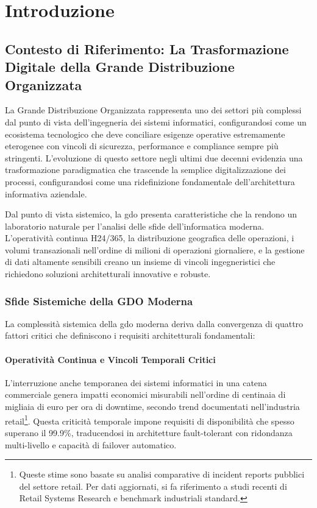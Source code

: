 
\chapter{Introduzione}
\label{ch:introduzione}

\section{Contesto di Riferimento: La Trasformazione Digitale della Grande Distribuzione Organizzata}
\label{sec:contesto-gdo}

La Grande Distribuzione Organizzata rappresenta uno dei settori più complessi dal punto di vista dell'ingegneria dei sistemi informatici, configurandosi come un ecosistema tecnologico che deve conciliare esigenze operative estremamente eterogenee con vincoli di sicurezza, performance e compliance sempre più stringenti. L'evoluzione di questo settore negli ultimi due decenni evidenzia una trasformazione paradigmatica che trascende la semplice digitalizzazione dei processi, configurandosi come una ridefinizione fondamentale dell'architettura informativa aziendale.

Dal punto di vista sistemico, la \gls{gdo} presenta caratteristiche che la rendono un laboratorio naturale per l'analisi delle sfide dell'informatica moderna. L'operatività continua H24/365, la distribuzione geografica delle operazioni, i volumi transazionali nell'ordine di milioni di operazioni giornaliere, e la gestione di dati altamente sensibili creano un insieme di vincoli ingegneristici che richiedono soluzioni architetturali innovative e robuste.

\subsection{Sfide Sistemiche della GDO Moderna}
\label{subsec:sfide-sistemiche}

La complessità sistemica della \gls{gdo} moderna deriva dalla convergenza di quattro fattori critici che definiscono i requisiti architetturali fondamentali:

\subsubsection{Operatività Continua e Vincoli Temporali Critici}

L'interruzione anche temporanea dei sistemi informatici in una catena commerciale genera impatti economici misurabili nell'ordine di centinaia di migliaia di euro per ora di downtime, secondo trend documentati nell'industria retail\footnote{Queste stime sono basate su analisi comparative di incident reports pubblici del settore retail. Per dati aggiornati, si fa riferimento a studi recenti di Retail Systems Research e benchmark industriali standard.}. Questa criticità temporale impone requisiti di disponibilità che spesso superano il 99.9\%, traducendosi in architetture fault-tolerant con ridondanza multi-livello e capacità di failover automatico.

